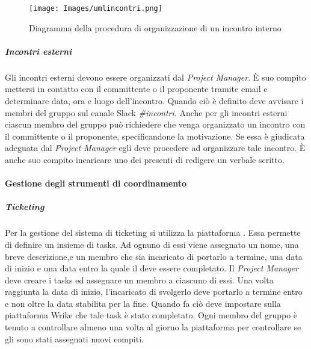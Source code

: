 \begin{figure}
	\centering
	\texttt{[image: Images/umlincontri.png]}
	\caption{Diagramma della procedura di organizzazione di un incontro interno}
\end{figure}

\subparagraph{Incontri esterni} \Spazio
Gli incontri esterni devono essere organizzati dal \emph{Project Manager}. È suo compito mettersi in contatto con il committente o il proponente tramite email e determinare data, ora e luogo dell'incontro. Quando ciò è definito deve avvisare i membri del gruppo sul canale Slack \emph{\#incontri}. Anche per gli incontri esterni ciascun membro del gruppo può richiedere che venga organizzato un incontro con il committente o il proponente, specificandone la motivazione. Se essa è giudicata adeguata dal \emph{Project Manager} egli deve procedere ad organizzare tale incontro. È anche suo compito incaricare uno dei presenti di redigere un verbale scritto.
\paragraph{Gestione degli strumenti di coordinamento}
\subparagraph{Ticketing} \Spazio
Per la gestione del sistema di ticketing si utilizza la piattaforma . Essa permette di definire un insieme di tasks. Ad ognuno di essi viene assegnato un nome, una breve descrizione,e un membro che sia incaricato di portarlo a termine, una data di inizio e una data entro la quale il  deve essere completato. Il \emph{Project Manager} deve creare i tasks ed assegnare un membro a ciascuno di essi. Una volta raggiunta la data di inizio, l'incaricato di svolgerlo deve portarlo a termine entro e non oltre la data stabilita per la fine. Quando fa ciò deve impostare sulla piattaforma Wrike che tale task è stato completato. Ogni membro del gruppo è tenuto a controllare almeno una volta al giorno la piattaforma per controllare se gli sono stati assegnati nuovi compiti.

